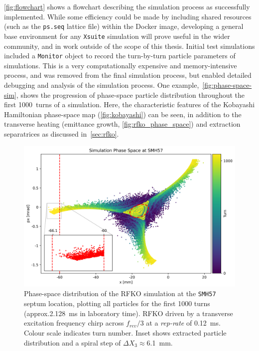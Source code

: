 \documentclass[a4paper,twoside,11pt]{report}
\begin{document}
\autoref{fig:flowchart} shows a flowchart describing the simulation process as successfully implemented. While some efficiency could be made by including shared resources (such as the \verb|ps.seq| lattice file) within the Docker image, developing a general base environment for any \verb|Xsuite| simulation will prove useful in the wider community, and in work outside of the scope of this thesis. Initial test simulations included a \verb|Monitor| object to record the turn-by-turn particle parameters of simulations. This is a very computationally expensive and memory-intensive process, and was removed from the final simulation process, but enabled detailed debugging and analysis of the simulation process. One example,~\autoref{fig:phase-space-sim}, shows the progression of phase-space particle distribution throughout the first \qty{1000}{turns} of a simulation. Here, the characteristic features of the Kobayashi Hamiltonian phase-space map (\autoref{fig:kobayashi}) can be seen, in addition to the transverse heating (emittance growth, \autoref{fig:rfko_phase_space}) and extraction separatrices as discussed in~\autoref{sec:rfko}.

\begin{figure}[h]
  \centering
  \includegraphics[width=0.9\linewidth]{phase-space-sim.png}
  \cprotect\caption[Simulated RFKO phase-space distribution at extraction septum]{Phase-space distribution of the RFKO simulation at the \verb|SMH57| septum location, plotting all particles for the first 1000 turns (approx.\qty{2.128}{\milli\second} in laboratory time). RFKO driven by a transverse excitation frequency chirp across $f_{rev}/3$ at a \textit{rep-rate} of \qty{0.12}{\milli\second}. Colour scale indicates turn number. Inset shows extracted particle distribution and a spiral step of $\Delta X_3\approx$\qty{6.1}{\milli\meter}.}\label{fig:phase-space-sim}
\end{figure}
\end{document}
